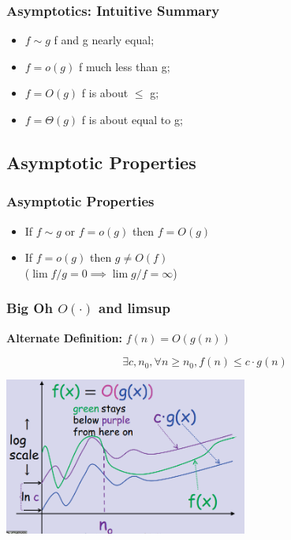 \documentclass{beamer}
\begin{document}
\begin{frame}
  \frametitle{Asymptotics: Intuitive Summary}

  {\larger

    \begin{itemize}
    \item $f\sim g$ \hfill f and g nearly equal;
      \bigskip

    \item $f = o(g)$ \hfill f much less than g;
      \bigskip

    \item $f = O(g)$ \hfill f is about $\leq$ g;
      \bigskip

    \item $f = \Theta(g)$ \hfill f is about equal to g;
    \end{itemize}

    
  }
\end{frame}

\subsection{Asymptotic Properties}

\begin{frame}
  \frametitle{Asymptotic Properties}

  {\larger

    \begin{itemize}
    \item If $f \sim g$ or $f = o(g)$ then $f = O(g)$
      \bigskip
      
    \item If $f = o(g)$ then $g \neq O(f)$\\
      \hfill ($\lim f/g = 0 \implies \lim g/f = \infty$)
      \bigskip
    \end{itemize}
  }
\end{frame}

\begin{frame}
  \frametitle{Big Oh $O(\cdot)$ and limsup}

  {\larger
    {\bf Alternate Definition:} $f(n) = O(g(n))$

    \begin{equation}
      \exists c,n_0, \forall n \geq n_0, f(n) \leq c\cdot g(n)
    \end{equation}

    \begin{center}
      \includegraphics[width=0.6\textwidth]{../img/bigOh}
    \end{center}
    
  }
\end{frame}
\end{document}
